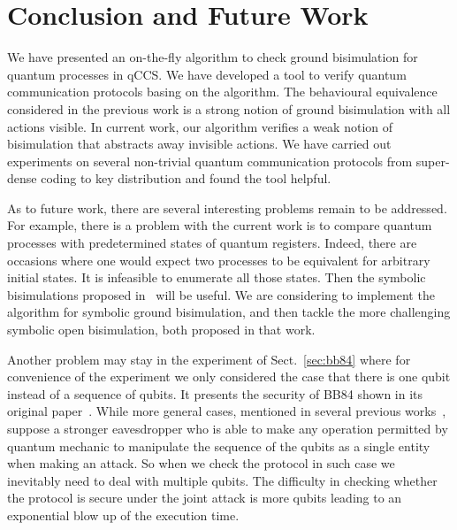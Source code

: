 \documentclass[runningheads]{llncs}
\begin{document}
\section{Conclusion and Future Work}\label{sec:con}
We have presented an on-the-fly algorithm to check ground bisimulation for quantum processes in qCCS. We have developed a tool to verify quantum communication protocols basing on the algorithm. The behavioural equivalence considered in the previous work is a strong notion of ground bisimulation with all actions visible. In current work, our algorithm verifies a weak notion of bisimulation that abstracts away invisible actions. We have carried out experiments on several non-trivial quantum communication protocols from super-dense coding to key distribution and found the tool helpful.

As to future work, there are several interesting problems remain to be addressed.
For example, there is a problem with the current work is to compare quantum processes with predetermined states of quantum registers. Indeed, there are occasions where one would expect two processes to be equivalent for arbitrary initial states. It is infeasible to enumerate all those states. Then the symbolic bisimulations proposed in~\cite{FDY14} will be useful. We are considering to implement the algorithm for symbolic ground bisimulation, and then tackle the more challenging symbolic open bisimulation, both proposed in that work. 

Another problem may stay in the experiment of Sect.~\ref{sec:bb84} where for convenience of the experiment we only considered the case that there is one qubit instead of a sequence of qubits. It presents the security of BB84 shown in its original paper~\cite{BB84}. While more general cases, mentioned in several previous works~\cite{Mayers98,LC99,SP00}, suppose a stronger eavesdropper who is able to make any operation permitted by quantum mechanic to manipulate the sequence of the qubits as a single entity when making an attack. So when we check the protocol in such case we inevitably need to deal with multiple qubits. The difficulty in checking whether the protocol is secure under the joint attack is more qubits leading to an exponential blow up of the execution time.
%
%
%
% 
% 
%


\end{document}
